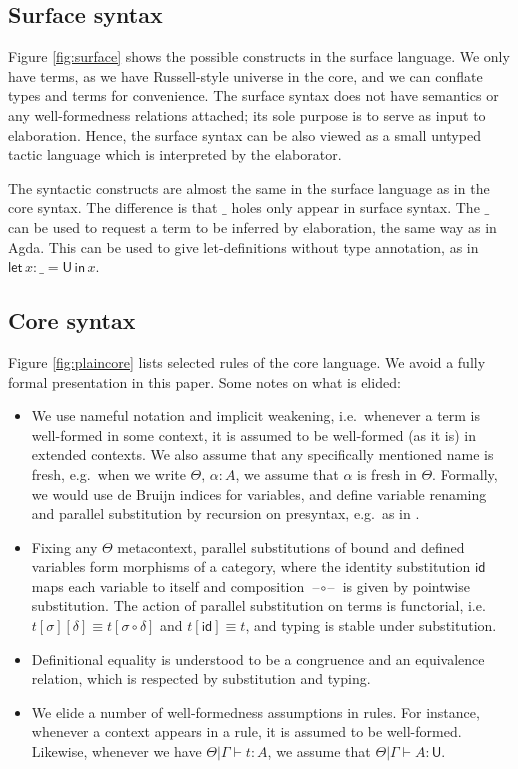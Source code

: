 \documentclass[acmsmall,review,anonymous,prologue,dvipsnames]{acmart}\settopmatter{printfolios=true,printccs=false,printacmref=false}
\newcommand{\slet}{\boldsymbol{\mathsf{let}}}
\renewcommand{\sin}{\boldsymbol{\mathsf{in}}}
\renewcommand{\U}{\mathsf{U}}
\newcommand{\id}{\mathsf{id}}
\newcommand{\blank}{\mathord{\hspace{1pt}\text{--}\hspace{1pt}}}
\theoremstyle{remark}
\begin{document}
\subsection{Surface syntax}
Figure \ref{fig:surface} shows the possible constructs in the surface
language. We only have terms, as we have Russell-style universe in the core, and
we can conflate types and terms for convenience. The surface syntax does not
have semantics or any well-formedness relations attached; its sole purpose is to
serve as input to elaboration. Hence, the surface syntax can be also viewed as a
small untyped tactic language which is interpreted by the elaborator.

The syntactic constructs are almost the same in the surface language as in
the core syntax. The difference is that $\_$ holes only appear in surface
syntax. The $\_$ can be used to request a term to be inferred by elaboration,
the same way as in Agda.  This can be used to give let-definitions without type
annotation, as in $\slet\,x : \_ = \U\,\sin\,x$.

\subsection{Core syntax}

Figure \ref{fig:plaincore} lists selected rules of the core language. We avoid a
fully formal presentation in this paper. Some notes on what is elided:
\begin{itemize}
  \item We use nameful notation and implicit weakening, i.e.\ whenever a term is
    well-formed in some context, it is assumed to be well-formed (as it is) in
    extended contexts. We also assume that any specifically mentioned name is
    fresh, e.g.\ when we write $\Theta,\,\alpha : A$, we assume that $\alpha$ is
    fresh in $\Theta$.  Formally, we would use de Bruijn indices for variables,
    and define variable renaming and parallel substitution by recursion on
    presyntax, e.g.\ as in \cite{schafer2015autosubst}.
  \item Fixing any $\Theta$ metacontext, parallel substitutions of bound and
    defined variables form morphisms of a category, where the identity
    substitution $\id$ maps each variable to itself and composition
    $\blank\circ\blank$ is given by pointwise substitution. The action of
    parallel substitution on terms is functorial, i.e.\ $t[\sigma][\delta]
    \equiv t[\sigma\circ\delta]$ and $t[\id] \equiv t$, and typing is stable
    under substitution.
  \item
    Definitional equality is understood to be a congruence and an equivalence relation,
    which is respected by substitution and typing.
  \item
    We elide a number of well-formedness assumptions in rules. For instance, whenever
    a context appears in a rule, it is assumed to be well-formed. Likewise, whenever
    we have $\Theta|\Gamma\vdash t : A$, we assume that $\Theta|\Gamma\vdash A : \U$.
\end{itemize}
\end{document}
